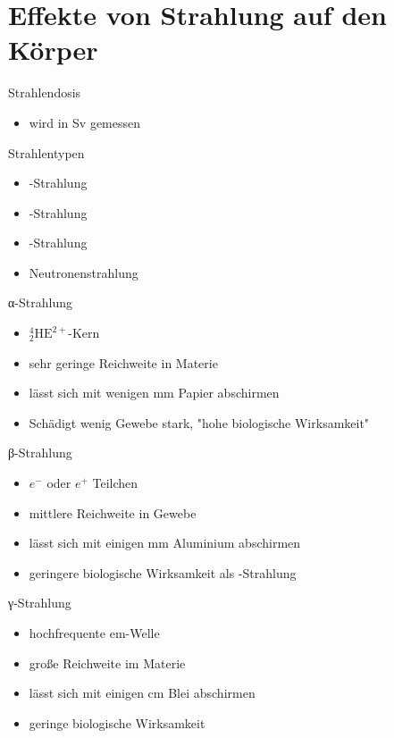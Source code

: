 \section{Effekte von Strahlung auf den Körper}
\begin{frame}{Strahlendosis}
\begin{itemize}
	\item wird in \si{\sievert} gemessen

\end{itemize}
\end{frame}
\begin{frame}{Strahlentypen}
	\begin{itemize}
		\item \alpha-Strahlung
		\item \beta-Strahlung
		\item \gamma-Strahlung
		\item Neutronenstrahlung
	\end{itemize}
\end{frame}
\begin{frame}{α-Strahlung}
	\begin{itemize}
		\item ${}^4_2\text{HE}^{2+}$-Kern
		\item sehr geringe Reichweite in Materie
		\item lässt sich mit wenigen \si{\milli \meter} Papier abschirmen
		\item Schädigt wenig Gewebe stark, "hohe biologische Wirksamkeit"
	\end{itemize}
\end{frame}
\begin{frame}{β-Strahlung}
\begin{itemize}
	\item $e^-$ oder $e^+$ Teilchen
	\item mittlere Reichweite in Gewebe
	\item lässt sich mit einigen \si{\milli \meter} Aluminium abschirmen
	\item geringere biologische Wirksamkeit als \alpha-Strahlung
\end{itemize}
\end{frame}
\begin{frame}{γ-Strahlung}
	\begin{itemize}
		\item hochfrequente em-Welle
		\item große Reichweite im Materie
		\item lässt sich mit einigen \si{\centi \meter} Blei abschirmen
		\item geringe biologische Wirksamkeit
	\end{itemize}
\end{frame}
